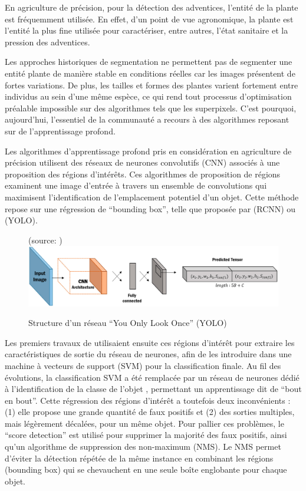 \documentclass[../thesis.tex]{subfiles}
\begin{document}
    En agriculture de précision, pour la détection des adventices, l'entité de la plante est fréquemment utilisée. En effet, d'un point de vue agronomique, la plante est l'entité la plus fine utilisée pour caractériser, entre autres, l'état sanitaire et la pression des adventices.
    
    Les approches historiques de segmentation ne permettent pas de segmenter une entité plante de manière stable en conditions réelles car les images présentent de fortes variations. De plus, les tailles et formes des plantes varient fortement entre individus au sein d'une même espèce, ce qui rend tout processus d'optimisation préalable impossible sur des algorithmes tels que les superpixels. C'est pourquoi, aujourd'hui, l'essentiel de la communauté a recours à des algorithmes reposant sur de l'apprentissage profond.
    
    \newpage
    Les algorithmes d'apprentissage profond pris en considération en agriculture de précision utilisent des réseaux de neurones convolutifs (CNN) associés à une proposition des régions d'intérêts. Ces algorithmes de proposition de régions examinent une image d'entrée à travers un ensemble de convolutions qui maximisent l'identification de l'emplacement potentiel d'un objet. Cette méthode repose sur une régression de ``bounding box'', telle que proposée par \cite{girshick2014rich} (RCNN) ou \cite{app10020612} (YOLO).
    
    \begin{figure}[H]
        \centering
        {\scriptsize (source: \cite{app10020612})} \\
        \includegraphics[width=0.7\linewidth]{img/biblio/segmentation-object}
        \caption{Structure d'un réseau ``You Only Look Once'' (YOLO)}
        \label{fig:07-03-segmentation-object}
    \end{figure}
    
    Les premiers travaux de \cite{girshick2014rich} utilisaient ensuite ces régions d'intérêt pour extraire les caractéristiques de sortie du réseau de neurones, afin de les introduire dans une machine à vecteurs de support (SVM) pour la classification finale. Au fil des évolutions, la classification SVM a été remplacée par un réseau de neurones dédié à l'identification de la classe de l'objet \cite{girshick2015fast}, permettant un apprentissage dit de ``bout en bout''. Cette régression des régions d'intérêt a toutefois deux inconvénients : (1) elle propose une grande quantité de faux positifs et (2) des sorties multiples, mais légèrement décalées, pour un même objet. Pour pallier ces problèmes, le ``score detection'' est utilisé pour supprimer la majorité des faux positifs, ainsi qu'un algorithme de suppression des non-maximum (NMS). Le NMS permet d'éviter la détection répétée de la même instance en combinant les régions (bounding box) qui se chevauchent en une seule boîte englobante pour chaque objet.
    
\end{document}
